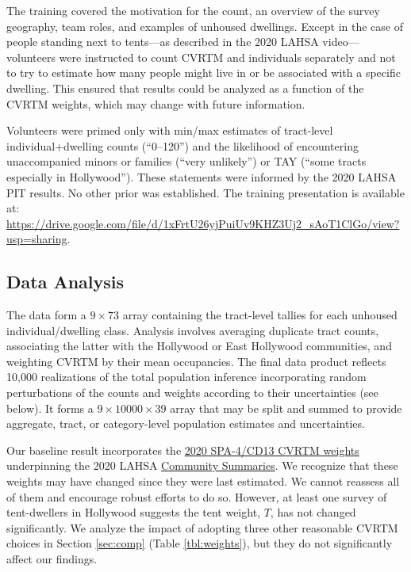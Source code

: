 \documentclass[11pt,twocolumn]{article}
\def\Count{count}
\begin{document}
The training covered the motivation for the \Count, an overview of the survey geography, team roles, 
and examples of unhoused dwellings. Except in the case of people standing next to tents---as described 
in the 2020 LAHSA video---volunteers were instructed to count CVRTM and individuals separately 
and not to try to estimate how many people might live in or be associated with a specific dwelling. 
This ensured that results could be analyzed as a function of the CVRTM weights, which may change 
with future information.%

Volunteers were primed only with min/max estimates of tract-level individual+dwelling counts 
(``0--120'') and the likelihood of encountering unaccompanied minors or families (``very unlikely'')
or TAY (``some tracts especially in Hollywood''). These statements were informed by the 2020 LAHSA PIT 
results. No other prior was established. The training presentation is available 
at: \url{https://drive.google.com/file/d/1xFrtU26yjPuiUv9KHZ3Uj2_sAoT1ClGo/view?usp=sharing}.

\subsection{Data Analysis}
\label{sec:analysis}

The data form a $9\times73$ array containing the tract-level tallies for each unhoused 
individual/dwelling class. Analysis involves averaging duplicate tract counts,
associating the latter with the Hollywood or East Hollywood communities, and 
weighting CVRTM by their mean occupancies. The final data product reflects 10,000 realizations 
of the total population inference incorporating random perturbations of the counts and weights 
according to their uncertainties (see below). It forms a $9\times10000\times39$ array that 
may be split and summed to provide aggregate, tract, or category-level population estimates and 
uncertainties.

Our baseline result incorporates the \href{https://www.lahsa.org/documents?id=4686-2020-greater-los-angeles-city-community-homelessness-report-service-planning-area-4.pdf}{2020 SPA-4/CD13 CVRTM weights}
underpinning the 2020 LAHSA \href{https://www.lahsa.org/documents?id=4686-2020-greater-los-angeles-city-community-homelessness-report-service-planning-area-4.pdf}
{Community Summaries}. We recognize that these weights may have changed since they were last
estimated. We cannot reassess all of them and encourage robust efforts to do so. However, at 
least one survey of tent-dwellers in Hollywood suggests the tent weight, $T$, has not changed 
significantly. We analyze the impact of adopting three other reasonable CVRTM choices in 
Section \ref{sec:comp} (Table \ref{tbl:weights}), but they do not significantly affect our findings.
\end{document}
